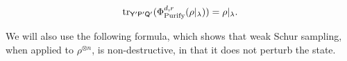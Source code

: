 



\begin{lemma}\label{lem:partial-trace-restriction}
    \begin{equation*}
        \tr_{\mathsf{Y}'\mathsf{P}'\mathsf{Q}'}(\Phi_{\mathrm{Purify}}^{d,r}(\rho|_{\lambda})) = \rho|_{\lambda}.
    \end{equation*}
\end{lemma}

We will also use the following formula, which shows that  weak Schur sampling, when applied to $\rho^{\otimes n}$, is non-destructive, in that it does not perturb the state. 

